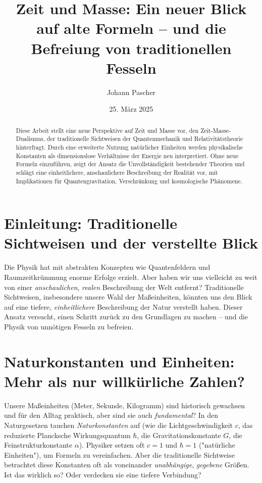 \documentclass[a4paper,12pt]{article}
\title{Zeit und Masse: Ein neuer Blick auf alte Formeln – und die Befreiung von traditionellen Fesseln}
\author{Johann Pascher}
\date{25. März 2025}
\begin{document}
	
	\maketitle
	
	\begin{abstract}
		Diese Arbeit stellt eine neue Perspektive auf Zeit und Masse vor, den Zeit-Masse-Dualismus, der traditionelle Sichtweisen der Quantenmechanik und Relativitätstheorie hinterfragt. Durch eine erweiterte Nutzung natürlicher Einheiten werden physikalische Konstanten als dimensionslose Verhältnisse der Energie neu interpretiert. Ohne neue Formeln einzuführen, zeigt der Ansatz die Unvollständigkeit bestehender Theorien und schlägt eine einheitlichere, anschaulichere Beschreibung der Realität vor, mit Implikationen für Quantengravitation, Verschränkung und kosmologische Phänomene.
	\end{abstract}
	
	\tableofcontents
	\newpage
	
	\section{Einleitung: Traditionelle Sichtweisen und der verstellte Blick}
	Die Physik hat mit abstrakten Konzepten wie Quantenfeldern und Raumzeitkrümmung enorme Erfolge erzielt. Aber haben wir uns vielleicht zu weit von einer \emph{anschaulichen}, \emph{realen} Beschreibung der Welt entfernt? Traditionelle Sichtweisen, insbesondere unsere Wahl der Maßeinheiten, könnten uns den Blick auf eine tiefere, \emph{einheitlichere} Beschreibung der Natur verstellt haben. Dieser Ansatz versucht, einen Schritt zurück zu den Grundlagen zu machen – und die Physik von unnötigen Fesseln zu befreien.
	
	\section{Naturkonstanten und Einheiten: Mehr als nur willkürliche Zahlen?}
	Unsere Maßeinheiten (Meter, Sekunde, Kilogramm) sind historisch gewachsen und für den Alltag praktisch, aber sind sie auch \emph{fundamental}? In den Naturgesetzen tauchen \emph{Naturkonstanten} auf (wie die Lichtgeschwindigkeit \(c\), das reduzierte Plancksche Wirkungsquantum \(\hbar\), die Gravitationskonstante \(G\), die Feinstrukturkonstante \(\alpha\)). Physiker setzen oft \(c = 1\) und \(\hbar = 1\) ("natürliche Einheiten"), um Formeln zu vereinfachen. Aber die traditionelle Sichtweise betrachtet diese Konstanten oft als voneinander \emph{unabhängige}, \emph{gegebene} Größen. Ist das wirklich so? Oder verdecken sie eine tiefere Verbindung?
	
\end{document}
